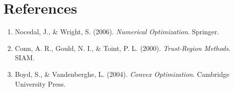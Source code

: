 \documentclass[11pt]{article}
\begin{document}
\section*{References}
\begin{enumerate}
\item Nocedal, J., \& Wright, S. (2006). \emph{Numerical Optimization}. Springer.
\item Conn, A. R., Gould, N. I., \& Toint, P. L. (2000). \emph{Trust-Region Methods}. SIAM.
\item Boyd, S., \& Vandenberghe, L. (2004). \emph{Convex Optimization}. Cambridge University Press.
\end{enumerate}
\end{document}
